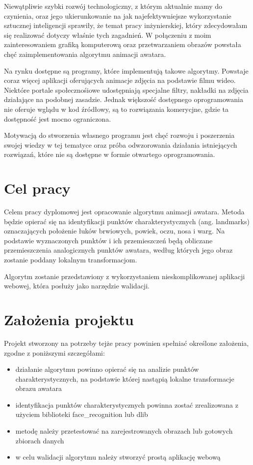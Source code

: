 Niewątpliwie szybki rozwój technologiczny, z którym aktualnie mamy do czynienia, oraz jego ukierunkowanie na jak najefektywniejsze wykorzystanie sztucznej inteligencji sprawiły, że temat pracy inżynierskiej, który zdecydowałam się realizować dotyczy właśnie tych zagadnień. W połączeniu z moim zainteresowaniem grafiką komputerową oraz przetwarzaniem obrazów powstała chęć zaimplementowania algorytmu animacji awatara.

Na rynku dostępne są programy, które implementują takowe algorytmy. Powstaje coraz więcej aplikacji oferujących animacje zdjęcia na podstawie filmu wideo. Niektóre portale społecznośiowe udostępniają specjalne filtry, nakładki na zdjęcia działające na podobnej zasadzie. Jednak większość dostępnego oprogramowania nie oferuje wglądu w kod źródłowy, są to rozwiązania komerycjne, gdzie ta dostępność jest mocno ograniczona.

Motywacją do stworzenia własnego programu jest chęć rozwoju i poszerzenia swojej wiedzy w tej tematyce oraz próba odwzorowania działania istniejących rozwiązań, które nie są dostępne w formie otwartego oprogramowania. 



\section{Cel pracy}

Celem pracy dyplomowej jest opracowanie algorytmu animacji awatara. Metoda będzie opierać się na identyfikacji punktów charakterystycznych (ang. landmarks) oznaczających położenie łuków brwiowych, powiek, oczu, nosa i warg. Na podstawie wyznaczonych punktów i ich przemieszczeń będą obliczane przemieszczenia analogicznych punktów awatara, według których jego obraz zostanie poddany lokalnym transformacjom.

Algorytm zostanie przedstawiony z wykorzystaniem nieskomplikowanej aplikacji webowej, która posłuży jako narzędzie walidacji.


\section{Założenia projektu}
\label{sec:zalozeniaProjektu}
Projekt stworzony na potrzeby tejże pracy powinien spełniać określone założenia, zgodne z poniższymi szczegółami:
\begin{itemize}
    \item działanie algorytmu powinno opierać się na analizie punktów charakterystycznych, na podstawie której nastąpią lokalne transformacje obrazu awatara
    \item identyfikacja punktów charakterystycznych powinna zostać zrealizowana z użyciem biblioteki face\_recognition lub dlib
    \item metodę należy przetestować na zarejestrowanych obrazach lub gotowych zbiorach danych
    \item w celu walidacji algorytmu należy stworzyć prostą aplikację webową
\end{itemize}

